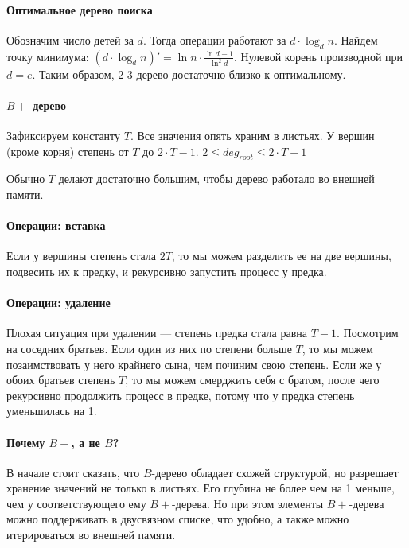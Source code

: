 \documentclass[12pt]{article}
\begin{document}
\paragraph{Оптимальное дерево поиска}

Обозначим число детей за $d$. Тогда операции работают за $d \cdot \log_d n$. Найдем точку минимума: $(d \cdot \log_d n)' = \ln n \cdot \frac{\ln d - 1}{\ln^2 d}$. Нулевой корень производной при $d=e$. Таким образом, 2-3 дерево достаточно близко к оптимальному.


\paragraph{$B+$ дерево}

Зафиксируем константу $T$. Все значения опять храним в листьях. У вершин (кроме корня) степень от $T$ до $2 \cdot T - 1$. $2 \le deg_{root} \le 2 \cdot T - 1$

Обычно $T$ делают достаточно большим, чтобы дерево работало во внешней памяти.

\paragraph{Операции: вставка}

Если у вершины степень стала $2T$, то мы можем разделить ее на две вершины, подвесить их к предку, и рекурсивно запустить процесс у предка.

\paragraph{Операции: удаление}

Плохая ситуация при удалении --- степень предка стала равна $T - 1$. Посмотрим на соседних братьев. Если один из них по степени больше $T$, то мы можем позаимствовать у него крайнего сына, чем починим свою степень. Если же у обоих братьев степень $T$, то мы можем смерджить себя с братом, после чего рекурсивно продолжить процесс в предке, потому что у предка степень уменьшилась на 1.

\paragraph{Почему $B+$, а не $B$?} В начале стоит сказать, что $B$-дерево обладает схожей структурой, но разрешает хранение значений не только в листьях. Его глубина не более чем на 1 меньше, чем у соответствующего ему $B+$-дерева. Но при этом элементы $B+$-дерева можно поддерживать в двусвязном списке, что удобно, а также можно итерироваться во внешней памяти.
\end{document}
